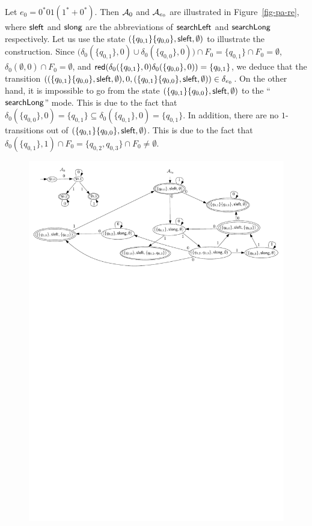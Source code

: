 
\begin{example}\label{exmp-pa-re}
Let $e_0 = 0^*0 1(1^* + 0^*)$. Then $\mathcal{A}_{0}$ and $\mathcal{A}_{e_0}$ are illustrated in Figure~\ref{fig-pa-re}, where ${\sf sleft}$ and ${\sf slong}$ are the abbreviations of $\mathsf{searchLeft}$ and $\mathsf{searchLong}$ respectively. Let us use the state $(\{q_{0,1}\}\{q_{0,0}\}, {\sf sleft}, \emptyset)$ to illustrate the construction. Since $\big(\delta_0(\{q_{0,1}\}, 0) \cup \delta_0(\{q_{0,0}\}, 0)\big) \cap F_0 = \{q_{0,1}\} \cap F_0 = \emptyset$, $\delta_0(\emptyset, 0) \cap F_0 = \emptyset$, and $\mathsf{red}(\delta_0(\{q_{0,1}\}, 0) \delta_0(\{q_{0,0}\}, 0))=\{q_{0,1}\}$, we deduce that the transition $((\{q_{0,1}\}\{q_{0,0}\}, {\sf sleft}, \emptyset), 0, (\{q_{0,1}\} \{q_{0,0}\}, {\sf sleft}, \emptyset)) \in \delta_{e_0}$. On the other hand, it is impossible to go from the state $(\{q_{0,1}\}\{q_{0,0}\}, {\sf sleft}, \emptyset)$ to the ``$\mathsf{searchLong}$'' mode. This is due to the fact that $\delta_0(\{q_{0,0}\}, 0)=\{q_{0,1}\} \subseteq \delta_0(\{q_{0,1}\},0)=\{q_{0,1}\}$. In addition, there are no $1$-transitions out of $(\{q_{0,1}\}\{q_{0,0}\}, {\sf sleft}, \emptyset)$. This is due to the fact that $\delta_0(\{q_{0,1}\}, 1) \cap F_0 = \{q_{0,2}, q_{0,3}\} \cap F_0 \neq \emptyset$.
%
\begin{figure}[htbp]
\begin{center}
\includegraphics[scale=0.7]{regular-expression-example.pdf}

\end{center}
\end{figure}
\end{example}
